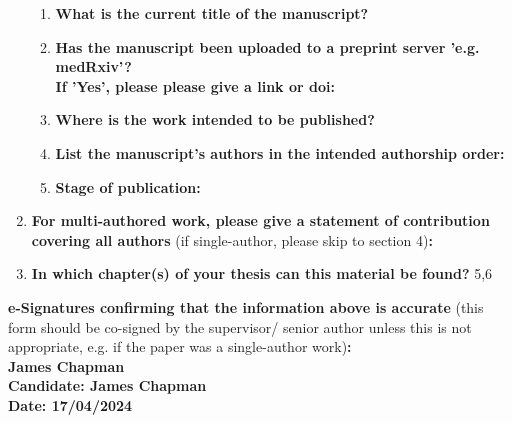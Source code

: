 \begin{enumerate}
%		
	\begin{enumerate}\itemsep0em
		\item \textbf{What is the current title of the manuscript?}
		\item \textbf{Has the manuscript been uploaded to a preprint server 'e.g. medRxiv'? 
		\\
		If 'Yes', please please give a link or doi:}
		\item \textbf{Where is the work intended to be published?}
		\item \textbf{List the manuscript's authors in the intended authorship order:}
		\item \textbf{Stage of publication:}
	\end{enumerate}
	
	\item \textbf{For multi-authored work, please give a statement of contribution covering all authors} (if single-author, please skip to section 4)\textbf{:}
	\item \textbf{In which chapter(s) of your thesis can this material be found?}
	5,6
\end{enumerate}

	\textbf{e-Signatures confirming that the information above is accurate}
	(this form should be co-signed by the supervisor/ senior author unless this is not appropriate, e.g. if the paper was a single-author work)\textbf{:}\\
	\textbf{James Chapman}\\ 
	\textbf{Candidate: James Chapman}\\
	\textbf{Date: 17/04/2024}\\


% 
